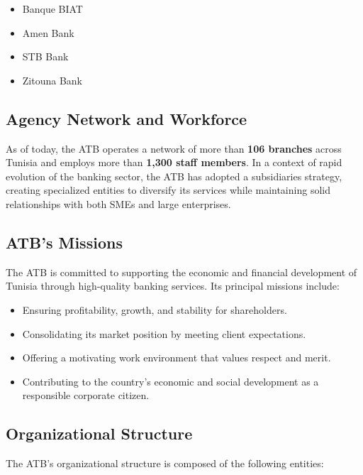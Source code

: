 \begin{itemize}
    \item Banque BIAT
    \item Amen Bank
    \item STB Bank
    \item Zitouna Bank
\end{itemize}

\subsection{Agency Network and Workforce}

As of today, the ATB operates a network of more than \textbf{106 branches} across Tunisia
and employs more than \textbf{1,300 staff members}. In a context of rapid evolution of the
banking sector, the ATB has adopted a subsidiaries strategy, creating specialized entities to
diversify its services while maintaining solid relationships with both SMEs and large enterprises.

\subsection{ATB's Missions}

The ATB is committed to supporting the economic and financial development of Tunisia through
high-quality banking services. Its principal missions include:

\begin{itemize}
    \item Ensuring profitability, growth, and stability for shareholders.
    \item Consolidating its market position by meeting client expectations.
    \item Offering a motivating work environment that values respect and merit.
    \item Contributing to the country's economic and social development as a responsible
    corporate citizen.
\end{itemize}

\subsection{Organizational Structure}

The ATB's organizational structure is composed of the following entities:

